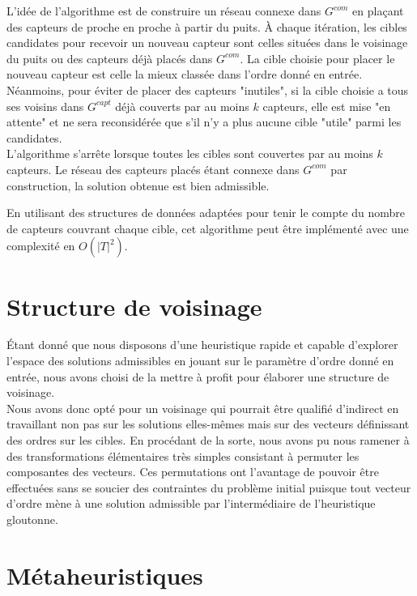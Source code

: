 \documentclass[12pt]{article}
\begin{document}
\bigskip

L'idée de l'algorithme est de construire un réseau connexe dans $G^{com}$ en plaçant des capteurs de proche en proche à partir du puits.
À chaque itération, les cibles candidates pour recevoir un nouveau capteur sont celles situées dans le voisinage du puits ou des capteurs déjà placés dans $G^{com}$.
La cible choisie pour placer le nouveau capteur est celle la mieux classée dans l'ordre donné en entrée.
Néanmoins, pour éviter de placer des capteurs "inutiles", si la cible choisie a tous ses voisins dans $G^{capt}$ déjà couverts par au moins $k$ capteurs, elle est mise "en attente" et ne sera reconsidérée que s'il n'y a plus aucune cible "utile" parmi les candidates.\\
L'algorithme s'arrête lorsque toutes les cibles sont couvertes par au moins $k$ capteurs.
Le réseau des capteurs placés étant connexe dans $G^{com}$ par construction, la solution obtenue est bien admissible.

\bigskip

En utilisant des structures de données adaptées pour tenir le compte du nombre de capteurs couvrant chaque cible, cet algorithme peut être implémenté avec une complexité en $O(|T|^2)$.



\section{Structure de voisinage}

Étant donné que nous disposons d'une heuristique rapide et capable d'explorer l'espace des solutions admissibles en jouant sur le paramètre d'ordre donné en entrée, nous avons choisi de la mettre à profit pour élaborer une structure de voisinage.\\
Nous avons donc opté pour un voisinage qui pourrait être qualifié d'indirect en travaillant non pas sur les solutions elles-mêmes mais sur des vecteurs définissant des ordres sur les cibles.
En procédant de la sorte, nous avons pu nous ramener à des transformations élémentaires très simples consistant à permuter les composantes des vecteurs.
Ces permutations ont l'avantage de pouvoir être effectuées sans se soucier des contraintes du problème initial puisque tout vecteur d'ordre mène à une solution admissible par l'intermédiaire de l'heuristique gloutonne.



\section{Métaheuristiques}
\end{document}
